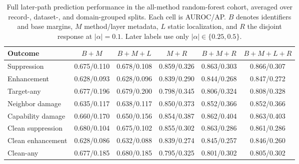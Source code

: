\begin{table}[t]
\centering
\caption{Full later-path prediction performance in the all-method random-forest cohort, averaged over record-, dataset-, and domain-grouped splits. Each cell is AUROC/AP. $B$ denotes identifiers and base margins, $M$ method/layer metadata, $L$ static localization, and $R$ the disjoint response at $|\alpha|=0.1$. Later labels use only $|\alpha|\in\{0.25,0.5\}$.}
\label{tab:full-prediction-main}
\begin{tabular}{@{}lccccc@{}}
\toprule
Outcome & $B+M$ & $B+M+L$ & $M+R$ & $B+M+R$ & $B+M+L+R$ \\
\midrule
Suppression & 0.675/0.110 & 0.678/0.108 & 0.859/0.326 & 0.863/0.303 & 0.866/0.307 \\
Enhancement & 0.628/0.093 & 0.628/0.096 & 0.839/0.290 & 0.844/0.268 & 0.847/0.272 \\
Target-any & 0.677/0.196 & 0.679/0.200 & 0.798/0.345 & 0.806/0.324 & 0.808/0.328 \\
Neighbor damage & 0.635/0.117 & 0.638/0.117 & 0.850/0.373 & 0.852/0.366 & 0.852/0.366 \\
Capability damage & 0.660/0.170 & 0.650/0.156 & 0.854/0.387 & 0.862/0.404 & 0.863/0.403 \\
Clean suppression & 0.680/0.104 & 0.675/0.102 & 0.855/0.302 & 0.863/0.286 & 0.861/0.286 \\
Clean enhancement & 0.628/0.086 & 0.632/0.088 & 0.839/0.274 & 0.845/0.257 & 0.846/0.260 \\
Clean-any & 0.677/0.185 & 0.680/0.185 & 0.795/0.325 & 0.801/0.302 & 0.805/0.302 \\
\bottomrule
\end{tabular}
\end{table}
